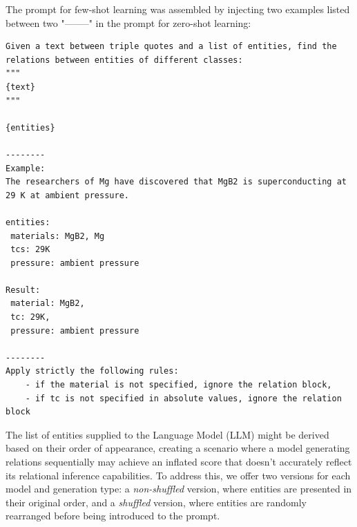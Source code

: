 \documentclass[a4paper]{article}
\begin{document}

    

The prompt for few-shot learning was assembled by injecting two examples listed between two "--------" in the prompt for zero-shot learning:

\begin{lstlisting}[caption=Few-shot prompting for extracting relations from lists of entities]
Given a text between triple quotes and a list of entities, find the relations between entities of different classes: 
"""
{text}
"""

{entities}

--------
Example: 
The researchers of Mg have discovered that MgB2 is superconducting at 29 K at ambient pressure.

entities:
 materials: MgB2, Mg
 tcs: 29K
 pressure: ambient pressure
 
Result: 
 material: MgB2, 
 tc: 29K, 
 pressure: ambient pressure
 
--------
Apply strictly the following rules:  
    - if the material is not specified, ignore the relation block,
    - if tc is not specified in absolute values, ignore the relation block 
\end{lstlisting}


The list of entities supplied to the Language Model (LLM) might be derived based on their order of appearance, creating a scenario where a model generating relations sequentially may achieve an inflated score that doesn't accurately reflect its relational inference capabilities. 
To address this, we offer two versions for each model and generation type: a \emph{non-shuffled} version, where entities are presented in their original order, and a \emph{shuffled} version, where entities are randomly rearranged before being introduced to the prompt.
\end{document}
